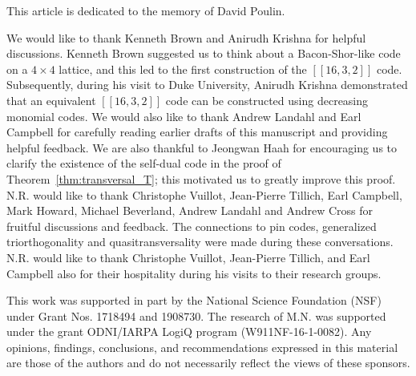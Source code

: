 \documentclass[twoside,romanappendices]{IEEEtran}
\newcommand{\llbr}{[\![}
\newcommand{\rrbr}{]\!]}
\begin{document}
This article is dedicated to the memory of David Poulin.

We would like to thank Kenneth Brown and Anirudh Krishna for helpful discussions.
Kenneth Brown suggested us to think about a Bacon-Shor-like code on a $4 \times 4$ lattice, and this led to the first construction of the $\llbr 16,3,2 \rrbr$ code.
Subsequently, during his visit to Duke University, Anirudh Krishna demonstrated that an equivalent $\llbr 16,3,2 \rrbr$ code can be constructed using decreasing monomial codes.
We would also like to thank Andrew Landahl and Earl Campbell for carefully reading earlier drafts of this manuscript and providing helpful feedback.
We are also thankful to Jeongwan Haah for encouraging us to clarify the existence of the self-dual code in the proof of Theorem~\ref{thm:transversal_T}; this motivated us to greatly improve this proof.
N.R. would like to thank Christophe Vuillot, Jean-Pierre Tillich, Earl Campbell, Mark Howard, Michael Beverland, Andrew Landahl and Andrew Cross for fruitful discussions and feedback.
The connections to pin codes, generalized triorthogonality and quasitransversality were made during these conversations.
N.R. would like to thank Christophe Vuillot, Jean-Pierre Tillich, and Earl Campbell also for their hospitality during his visits to their research groups.

This work was supported in part by the National Science Foundation (NSF) under Grant Nos. 1718494 and 1908730. 
The research of M.N. was supported under the grant ODNI/IARPA LogiQ program (W911NF-16-1-0082).
Any opinions, findings, conclusions, and recommendations expressed in this material are those of the authors and do not necessarily reflect the views of these sponsors.


%
%
\end{document}
